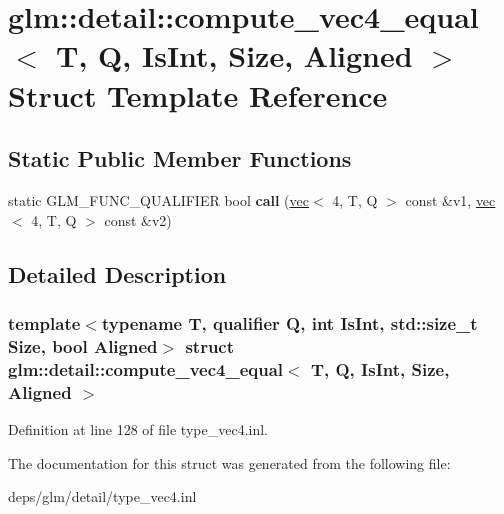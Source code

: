 \hypertarget{structglm_1_1detail_1_1compute__vec4__equal}{}\section{glm\+:\+:detail\+:\+:compute\+\_\+vec4\+\_\+equal$<$ T, Q, Is\+Int, Size, Aligned $>$ Struct Template Reference}
\label{structglm_1_1detail_1_1compute__vec4__equal}
\subsection*{Static Public Member Functions}
\begin{DoxyCompactItemize}
\item 
\mbox{\label{structglm_1_1detail_1_1compute__vec4__equal_a5b7d0b1229e2c3d669e6937cf4977aa4}} 
static G\+L\+M\+\_\+\+F\+U\+N\+C\+\_\+\+Q\+U\+A\+L\+I\+F\+I\+ER bool {\bfseries call} (\hyperlink{structglm_1_1vec}{vec}$<$ 4, T, Q $>$ const \&v1, \hyperlink{structglm_1_1vec}{vec}$<$ 4, T, Q $>$ const \&v2)
\end{DoxyCompactItemize}


\subsection{Detailed Description}
\subsubsection*{template$<$typename T, qualifier Q, int Is\+Int, std\+::size\+\_\+t Size, bool Aligned$>$\newline
struct glm\+::detail\+::compute\+\_\+vec4\+\_\+equal$<$ T, Q, Is\+Int, Size, Aligned $>$}



Definition at line 128 of file type\+\_\+vec4.\+inl.



The documentation for this struct was generated from the following file\+:\begin{DoxyCompactItemize}
\item 
deps/glm/detail/type\+\_\+vec4.\+inl\end{DoxyCompactItemize}
